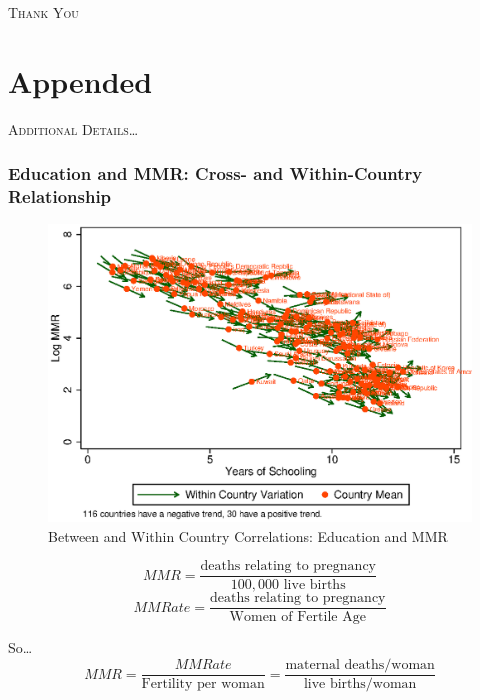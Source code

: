 \documentclass[10pt,letterpaper,subeqn, xcolor=table]{beamer}
\begin{document}
\begin{frame}
\begin{center}
\Large	
\textsc{\textcolor{dblue}{Thank You}}
\end{center}
\end{frame}

\section{Appended}
\begin{frame}
\begin{center}
\Large	
\textsc{\textcolor{dblue}{Additional Details\ldots}}
\end{center}
\end{frame}

\begin{frame}
\frametitle{Education and MMR: Cross- and Within-Country Relationship}
\begin{figure}
\includegraphics[scale=0.62]{./figures/countries}  
\caption{Between and Within Country Correlations: Education and MMR}
\end{figure}
\end{frame}

\begin{frame}[label=MMRnote]
\begin{center}
\begin{equation}
MMR=\frac{\text{deaths relating to pregnancy}}{100,000 \text{ live births}}
\end{equation}
\vspace{5mm}
\begin{equation}
MMRate=\frac{\text{deaths relating to pregnancy}}{\text{Women of Fertile Age}}
\end{equation}
\end{center}
\vspace{8mm}
So\ldots
\begin{equation}
MMR = \frac{MMRate}{\text{Fertility per woman}}=\frac{\text{maternal deaths/woman}}{\text{live births/woman}}
\end{equation}
\hyperlink{DATA}{}
\end{frame}
\end{document}
